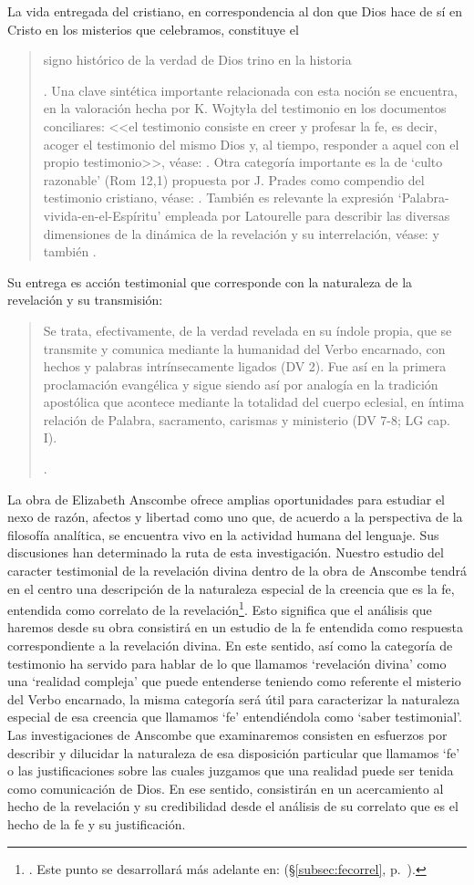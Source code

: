 La vida entregada del cristiano, en correspondencia al don que Dios hace de sí en Cristo en  los misterios que celebramos, constituye el \blockquote[{\Cite[Cf.][399]{prades2015testimonio}. Una clave sintética importante relacionada con esta noción se encuentra, en la valoración hecha por K. Wojtyła del testimonio en los documentos conciliares: <<el testimonio consiste en creer y profesar la fe, es decir, acoger el testimonio del mismo Dios y, al tiempo, responder a aquel con el propio testimonio>>, véase: \Cite[194-197]{prades2015testimonio}. Otra categoría importante es la de \enquote*{culto razonable} (Rom 12,1) propuesta por J. Prades como compendio del testimonio cristiano, véase: \Cite[405-430]{prades2015testimonio}. También es relevante la expresión \enquote*{Palabra-vivida-en-el-Espíritu} empleada por Latourelle para describir las diversas dimensiones de la dinámica de la revelación y su interrelación, véase: \Cite[Cf.][110]{latourelle1975et} y también \Cite[582]{ninot2009tf}.}]{signo histórico de la verdad de Dios trino en la historia}. Su entrega es acción testimonial que corresponde con la naturaleza de la revelación y su transmisión:
\blockquote[{\Cite[419-420]{prades2015testimonio}}.]{Se trata, efectivamente, de la verdad revelada en su índole propia, que se transmite y comunica mediante la humanidad del Verbo encarnado, con hechos y palabras intrínsecamente ligados (DV 2). Fue así en la primera proclamación evangélica y sigue siendo así por analogía en la tradición apostólica que acontece mediante la totalidad del cuerpo eclesial, en íntima relación de Palabra, sacramento, carismas y ministerio (DV 7-8; LG cap. I).}

La obra de Elizabeth Anscombe ofrece amplias oportunidades para estudiar el nexo de razón, afectos y libertad como uno que, de acuerdo a la perspectiva de la filosofía analítica, se encuentra vivo en la actividad humana del lenguaje. Sus discusiones han determinado la ruta de esta investigación. Nuestro estudio del caracter testimonial de la revelación divina dentro de la obra de Anscombe tendrá en el centro una descripción de la naturaleza especial de la creencia que es la fe, entendida como correlato de la revelación\footnote{\Cite[Cf.][185]{conesa1994cc}. Este punto se desarrollará más adelante en: (\S\ref{subsec:fecorrel}, p.~\pageref{subsec:fecorrel}).}. Esto significa que el análisis que haremos desde su obra consistirá en un estudio de la fe entendida como respuesta correspondiente a la revelación divina. En este sentido, así como la categoría de testimonio ha servido para hablar de lo que llamamos `revelación divina' como una `realidad compleja' que puede entenderse teniendo como referente el misterio del Verbo encarnado, la misma categoría será útil para caracterizar la naturaleza especial de esa creencia que llamamos `fe' entendiéndola como `saber testimonial'. Las investigaciones de Anscombe que examinaremos consisten en esfuerzos por describir y dilucidar la naturaleza de esa disposición particular que llamamos `fe' o las justificaciones sobre las cuales juzgamos que una realidad puede ser tenida como comunicación de Dios. En ese sentido, consistirán en un acercamiento al hecho de la revelación y su credibilidad desde el análisis de su correlato que es el hecho de la fe y su justificación. 

